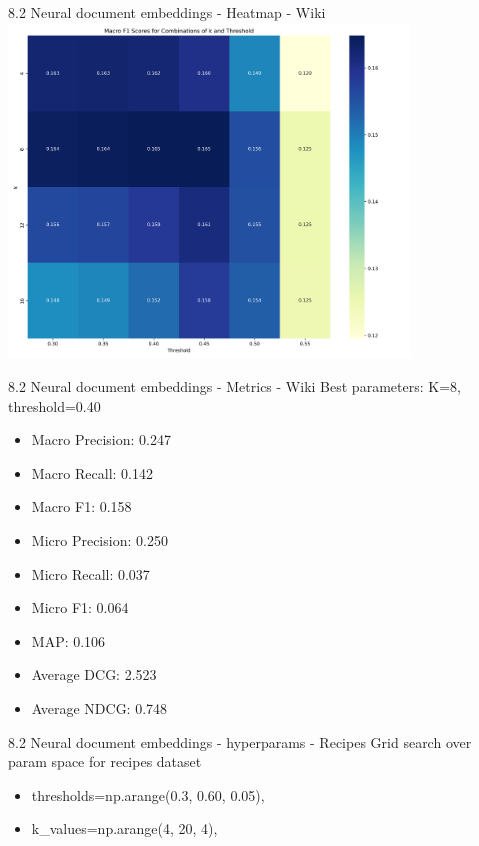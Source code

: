 \documentclass{beamer}
\begin{document}
\begin{frame}{8.2 Neural document embeddings - Heatmap - Wiki}
  \centering
  \includegraphics[width=0.8\textwidth]{wiki_embeddings_heatmap.png_1747347453.png}
\end{frame}


\begin{frame}{8.2 Neural document embeddings - Metrics - Wiki}
  Best parameters: K=8, threshold=0.40
  \begin{itemize}
    \item Macro Precision: 0.247
    \item Macro Recall: 0.142
    \item Macro F1: 0.158
    \item Micro Precision: 0.250
    \item Micro Recall: 0.037
    \item Micro F1: 0.064
    \item MAP: 0.106
    \item Average DCG: 2.523
    \item Average NDCG: 0.748
  \end{itemize}
\end{frame}

\begin{frame}{8.2 Neural document embeddings - hyperparams - Recipes}
  Grid search over param space for recipes dataset
  \begin{itemize}
    \item thresholds=np.arange(0.3, 0.60, 0.05),
    \item k\_values=np.arange(4, 20, 4),
  \end{itemize}
\end{frame}
\end{document}
